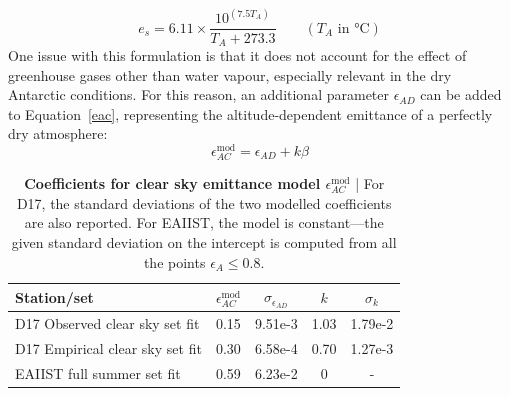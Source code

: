 \documentclass[11pt,a4paper]{article}
\newcommand{\mycaption}[2]{\caption{\textbf{#1} | #2}}
\begin{document}
\begin{equation}
	e_s = 6.11 \times \frac{10^{(7.5 T_A)}}{T_A + 273.3} \qquad (T_A \text{ in } \unit{\celsius})
\end{equation} 
One issue with this formulation is that it does not account for the effect of greenhouse gases other than water vapour, especially relevant in the dry Antarctic conditions. For this reason, an additional parameter $\epsilon_{AD}$ can be added to Equation~\eqref{eac}, representing the altitude-dependent emittance of a perfectly dry atmosphere:
\begin{equation}\label{eq:eacfull}
	\epsilon^{\mathrm{mod}}_{AC} = \epsilon_{AD} + k \beta
\end{equation}

\begin{table}[h]
	\centering
	\begin{tabular}{lSSSS}
		\toprule
		Station/set                     & {$\epsilon^{\mathrm{mod}}_{AC}$} & {$\sigma_{\epsilon_{AD}}$} & {$k$} & {$\sigma_{k}$} \\
		\midrule
		D17 Observed clear sky set fit  & 0.15              & 9.51e-3                    & 1.03  & 1.79e-2 \\
		D17 Empirical clear sky set fit & 0.30              & 6.58e-4                    & 0.70  & 1.27e-3 \\
		EAIIST full summer set fit      & 0.59              & 6.23e-2                        & 0     & {-} \\
		\bottomrule
	\end{tabular}
	\mycaption{Coefficients for clear sky emittance model $\epsilon_{AC}^{\mathrm{mod}}$}{For D17, the standard deviations of the two modelled coefficients are also reported. For EAIIST, the model is constant---the given standard deviation on the intercept is computed from all the points $\epsilon_{A} \leq 0.8$.}
	\label{tab:kad}
\end{table}
\end{document}
